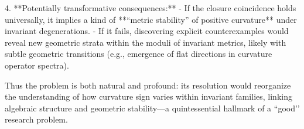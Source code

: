 4. **Potentially transformative consequences:**  
   - If the closure coincidence holds universally, it implies a kind of **“metric stability” of positive curvature** under invariant degenerations.
   - If it fails, discovering explicit counterexamples would reveal new geometric strata within the moduli of invariant metrics, likely with subtle geometric transitions (e.g., emergence of flat directions in curvature operator spectra).

Thus the problem is both natural and profound: its resolution would reorganize the understanding of how curvature sign varies within invariant families, linking algebraic structure and geometric stability—a quintessential hallmark of a “good’’ research problem.